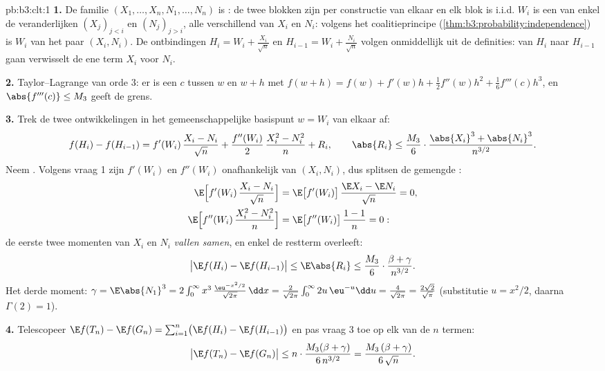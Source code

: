 \begin{solution}{pb:b3:clt:1}
\textbf{1.} De familie $(X_1, \dots, X_n, N_1, \dots, N_n)$
is : de twee blokken zijn per constructie
 van elkaar en elk blok is i.i.d. $W_i$ is een
 van enkel de veranderlijken $(X_j)_{j<i}$
en $(N_j)_{j>i}$, alle verschillend van $X_i$ en $N_i$:
volgens het coalitieprincipe
(\cref{thm:b3:probability:independence}) is $W_i$
 van het paar $(X_i, N_i)$. De ontbindingen
$H_i = W_i + \frac{X_i}{\sqrt n}$ en $H_{i-1} = W_i +
\frac{N_i}{\sqrt n}$ volgen onmiddellijk uit de definities:
van $H_i$ naar $H_{i-1}$ gaan verwisselt de ene term $X_i$
voor $N_i$.

\textbf{2.} Taylor--Lagrange van orde $3$: er is een $c$
tussen $w$ en $w + h$ met $f(w + h) = f(w) + f'(w)h +
\frac12f''(w)h^2 + \frac16f'''(c)h^3$, en $\abs{f'''(c)}
\leq M_3$ geeft de grens.

\textbf{3.} Trek de twee ontwikkelingen in het
gemeenschappelijke basispunt $w = W_i$ van elkaar af:
\[
f(H_i) - f(H_{i-1}) = f'(W_i)\,\frac{X_i - N_i}{\sqrt n} +
\frac{f''(W_i)}{2}\,\frac{X_i^2 - N_i^2}{n} + R_i,
\qquad
\abs{R_i} \leq \frac{M_3}{6}\cdot
\frac{\abs{X_i}^3 + \abs{N_i}^3}{n^{3/2}} .
\]
Neem . Volgens vraag 1 zijn $f'(W_i)$ en
$f''(W_i)$ onafhankelijk van $(X_i, N_i)$, dus splitsen de
gemengde :
\begin{align*}
\E\Bigl[f'(W_i)\,\frac{X_i - N_i}{\sqrt n}\Bigr] &=
\E\bigl[f'(W_i)\bigr]\,\frac{\E X_i - \E N_i}{\sqrt n} = 0,
\\
\E\Bigl[f''(W_i)\,\frac{X_i^2 - N_i^2}{n}\Bigr] &=
\E\bigl[f''(W_i)\bigr]\,\frac{1 - 1}{n} = 0 :
\end{align*}
de eerste twee momenten van $X_i$ en $N_i$ \emph{vallen
samen}, en enkel de restterm overleeft:
\[
\bigl|\E f(H_i) - \E f(H_{i-1})\bigr| \leq \E\abs{R_i} \leq
\frac{M_3}{6}\cdot\frac{\beta + \gamma}{n^{3/2}} .
\]
Het  derde moment: $\gamma = \E\abs{N_1}^3 =
2\int_0^\infty x^3\,\frac{\eu^{-x^2/2}}{\sqrt{2\pi}}\,\dd x
= \frac{2}{\sqrt{2\pi}}\int_0^\infty 2u\,\eu^{-u}\dd u =
\frac{4}{\sqrt{2\pi}} = \frac{2\sqrt2}{\sqrt\pi}$
(substitutie $u = x^2/2$, daarna $\Gamma(2) = 1$).

\textbf{4.} Telescopeer $\E f(T_n) - \E f(G_n) =
\sum_{i=1}^n\bigl(\E f(H_i) - \E f(H_{i-1})\bigr)$ en pas
vraag 3 toe op elk van de $n$ termen:
\[
\bigl|\E f(T_n) - \E f(G_n)\bigr| \leq
n \cdot \frac{M_3(\beta + \gamma)}{6\,n^{3/2}} =
\frac{M_3\,(\beta + \gamma)}{6\,\sqrt n} .
\]


\end{solution}
